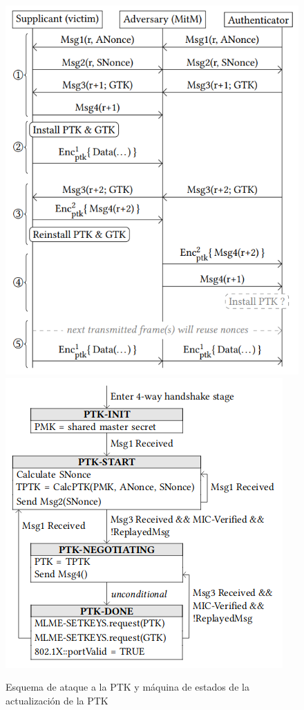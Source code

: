 \documentclass[10pt,a4paper]{article}
\begin{document}
\begin{figure}[ht]       
    \includegraphics[scale=0.4]{images/krack_supplicant_still_accept_plaintext.png}
    \hspace{10px}
    \includegraphics[scale=0.7]{images/wpa_state_machine.png}
    \caption{Esquema de ataque a la PTK y máquina de estados de la actualización de la PTK}
\end{figure}
\end{document}
